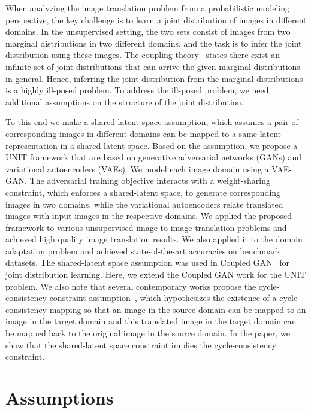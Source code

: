 \documentclass{article}
\begin{document}
When analyzing the image translation problem from a probabilistic modeling perspective, the key challenge is to learn a joint distribution of images in different domains. In the unsupervised setting, the two sets consist of images from two marginal distributions in two different domains, and the task is to infer the joint distribution using these images. The coupling theory~\cite{lindvall2002lectures} states there exist an infinite set of joint distributions that can arrive the given marginal distributions in general. Hence, inferring the joint distribution from the marginal distributions is a highly ill-posed problem. To address the ill-posed problem, we need additional assumptions on the structure of the joint distribution.


To this end we make a shared-latent space assumption, which assumes a pair of corresponding images in different domains can be mapped to a same latent representation in a shared-latent space. Based on the assumption, we propose a UNIT framework that are based on generative adversarial networks (GANs) and variational autoencoders (VAEs). We model each image domain using a VAE-GAN. The adversarial training objective interacts with a weight-sharing constraint, which enforces a shared-latent space, to generate corresponding images in two domains, while the variational autoencoders relate translated images with input images in the respective domains. We applied the proposed framework to various unsupervised image-to-image translation problems and achieved high quality image translation results. We also applied it to the domain adaptation problem and achieved state-of-the-art accuracies on benchmark datasets. The shared-latent space assumption was used in Coupled GAN~\cite{liu2016coupled} for joint distribution learning. Here, we extend the Coupled GAN work for the UNIT problem. We also note that several contemporary works propose the cycle-consistency constraint assumption~\cite{zhu2017unpaired,kim2017learning}, which hypothesizes the existence of a cycle-consistency mapping so that an image in the source domain can be mapped to an image in the target domain and this translated image in the target domain can be mapped back to the original image in the source domain. In the paper, we show that the shared-latent space constraint implies the cycle-consistency constraint. 

 \section{Assumptions}\label{sec::form}
\end{document}
